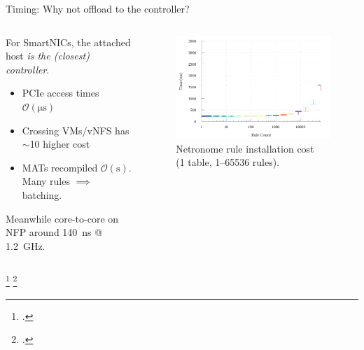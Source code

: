 \documentclass[aspectratio=169,xcolor={dvipsnames}
,handout
]{beamer}
\begin{document}
\begin{frame}{Timing: Why not offload to the controller?}
	\begin{columns}
		\begin{column}{0.5\linewidth}
			For SmartNICs, the attached host \emph{is the (closest) controller}.
			
			\begin{itemize}
				\item PCIe access times $\mathcal{O}(\si{\micro\second})$\footnotemark
				\item Crossing VMs/vNFS has $\sim$\qty{10}{\times} higher cost\footnotemark
				\item MATs recompiled $\mathcal{O}(\si{\second})$. Many rules $\implies$ batching.
			\end{itemize}
			
			
			\alert{Meanwhile core-to-core on NFP around \SI{140}{\nano\second} @ \SI{1.2}{\giga\hertz}.}
		\end{column}
		\begin{column}{0.5\linewidth}
			\begin{figure}
				\includegraphics[width=0.9\linewidth]{../plots/build/rte-timer/rte-times-logx}
				\caption{Netronome rule installation cost \\(1 table, \numrange{1}{65536} rules).}
			\end{figure}
		\end{column}
	\end{columns}
	\setcounter{footnote}{3}
	\footcitetext{DBLP:conf/sigcomm/NeugebauerAZAL018}
	\setcounter{footnote}{4}
	\footcitetext{DBLP:journals/cm/CzivaP17}
\end{frame}
\end{document}
